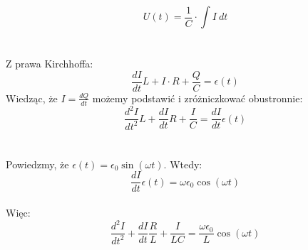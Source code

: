 \documentclass[14pt, table]{extarticle}
\begin{document}
$$ U(t) = \frac{1}{C} \cdot \int I \ dt $$ \\ \\
Z prawa Kirchhoffa:
$$ \frac{dI}{dt}L + I\cdot R + \frac{Q}{C} = \epsilon(t) $$
Wiedząc, że $I = \frac{dQ}{dt}$ możemy podstawić i zróżniczkować obustronnie:
$$ \frac{d^2I}{dt^2} L + \frac{dI}{dt} R + \frac{I}{C} = \frac{dI}{dt} \epsilon(t) $$\\ \\
Powiedzmy, że  $\epsilon(t) = \epsilon_0 \sin(\omega t)$. Wtedy:
$$ \frac{dI}{dt} \epsilon(t) = \omega \epsilon_0 \cos(\omega t) $$ \\
Więc:
$$ \frac{d^2I}{dt^2} + \frac{dI}{dt} \frac{R}{L} + \frac{I}{LC} = \frac{\omega \epsilon_0}{L} \cos(\omega t) $$
\end{document}
